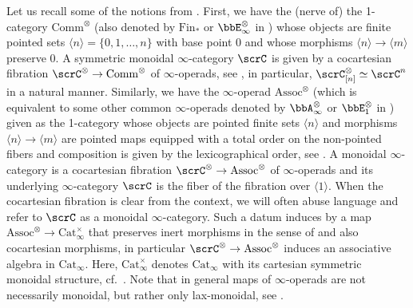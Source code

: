\documentclass[10pt, reqno]{amsart}
\theoremstyle{plain}
\theoremstyle{definition}
\numberwithin{equation}{section}
\begin{document}
	Let us recall some of the notions from \cite[Section 4.1]{Lur17}. First, we have the (nerve of) the 1-category 
	$\mathrm{Comm}^{\otimes}$ (also denoted by $\mathrm{Fin}_*$ or $\bbE^\otimes_\infty$ in \cite[Notation 2.0.0.2, Notation 5.1.1.6]{Lur17}) whose objects are finite pointed sets $\langle n \rangle=\{0,1,\dots, n\}$ with base point $0$ and whose morphisms $\langle n \rangle \to \langle m \rangle$ preserve $0$. A symmetric monoidal $\infty$-category $\scrC$ is given by a cocartesian fibration $\scrC^\otimes \to \mathrm{Comm}^\otimes$ of $\infty$-operads, see \cite[Example 2.1.2.18, Definition 2.1.1.10]{Lur17}, in particular, $\scrC^\otimes_{[n]} \simeq \scrC^n$ in a natural manner.
	Similarly, we have the $\infty$-operad $\mathrm{Assoc}^{\otimes}$ (which is equivalent to some other common $\infty$-operads denoted by $\bbA_\infty^\otimes$ or $\bbE_1^\otimes$ in \cite[Definition 4.1.1.3, Example 5.1.0.7]{Lur17}) given as the 1-category whose objects are pointed finite sets $\langle n \rangle$ and morphisms $\langle n \rangle \to \langle m \rangle$ are pointed maps equipped with a total order on the non-pointed fibers and composition is given by the lexicographical order, see \cite[Remark 4.1.1.4]{Lur17}. A monoidal $\infty$-category is a cocartesian fibration $\scrC^\otimes \to \mathrm{Assoc}^\otimes$ of $\infty$-operads and its underlying $\infty$-category $\scrC$ is the fiber of the fibration over $\langle 1\rangle$. When the cocartesian fibration is clear from the context, we will often abuse language and refer to $\scrC$ as a monoidal $\infty$-category. Such a datum induces by \cite[Propositions 2.4.1.7, 2.4.2.5]{Lur17} a map $\mathrm{Assoc}^\otimes \to \mathrm{Cat}_\infty^\times$ that preserves inert morphisms in the sense of \cite[Definitions 2.1.1.8, 2.1.2.3]{Lur17} and also cocartesian morphisms, in particular $\scrC^\otimes \to \mathrm{Assoc}^\otimes$ induces an associative algebra in $\mathrm{Cat}_{\infty}$. %
	Here, $\mathrm{Cat}^\times_\infty$ denotes $\mathrm{Cat}_\infty$ with its cartesian symmetric monoidal structure, cf.~\cite[Construction 2.4.1.4, Proposition 2.4.1.5]{Lur17}. Note that in general maps of $\infty$-operads are not necessarily monoidal, but rather only lax-monoidal, see \cite[Definition 2.1.3.7]{Lur17}.
	
\end{document}
